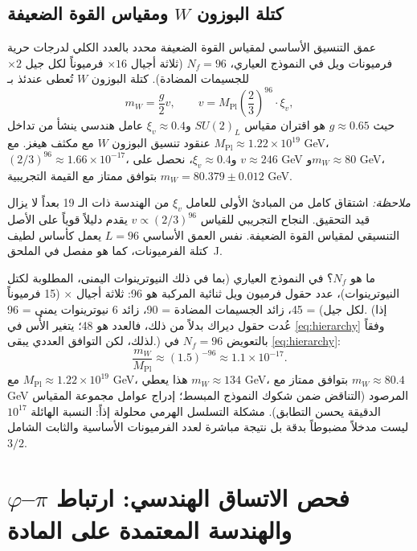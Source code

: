 \documentclass[12pt,a4paper]{article}
\begin{document}
	\subsection{كتلة البوزون \(W\) ومقياس القوة الضعيفة}
	
	عمق التنسيق الأساسي لمقياس القوة الضعيفة محدد بالعدد الكلي لدرجات حرية فرميونات ويل في النموذج العياري، \(N_f = 96\) (ثلاثة أجيال \(\times 16\) فرميوناً لكل جيل \(\times 2\) للجسيمات المضادة). كتلة البوزون \(W\) تُعطى عندئذ بـ
	\begin{equation}
		m_W = \frac{g}{2} v, \qquad v = M_{\mathrm{Pl}} \left( \frac{2}{3} \right)^{96} \cdot \xi_v,
		\label{eq:mw_yuct}
	\end{equation}
	حيث \(g \approx 0.65\) هو اقتران مقياس \(SU(2)_L\) و\(\xi_v \approx 0.4\) عامل هندسي ينشأ من تداخل عنقود تنسيق البوزون \(W\) مع مكثف هيغز. مع \(M_{\mathrm{Pl}} \approx 1.22\times10^{19}\) GeV، \((2/3)^{96} \approx 1.66\times10^{-17}\)، و\(\xi_v \approx 0.4\)، نحصل على \(v \approx 246\) GeV و\(m_W \approx 80\) GeV، بتوافق ممتاز مع القيمة التجريبية \(m_W = 80.379 \pm 0.012\) GeV.
	
	\textit{ملاحظة:} اشتقاق كامل من المبادئ الأولى للعامل \(\xi_v\) من الهندسة ذات الـ 19 بعداً لا يزال قيد التحقيق. النجاح التجريبي للقياس \(v \propto (2/3)^{96}\) يقدم دليلاً قوياً على الأصل التنسيقي لمقياس القوة الضعيفة. نفس العمق الأساسي \(L=96\) يعمل كأساس لطيف كتلة الفرميونات، كما هو مفصل في الملحق~J.
	
	ما هو \(N_f\)؟ في النموذج العياري (بما في ذلك النيوترينوات اليمنى، المطلوبة لكتل النيوترينوات)، عدد حقول فرميون ويل ثنائية المركبة هو 96: ثلاثة أجيال \(\times\) (15 فرميوناً لكل جيل) = 45، زائد الجسيمات المضادة = 90، زائد 6 نيوترينوات يمنى = 96. (إذا عُدت حقول ديراك بدلاً من ذلك، فالعدد هو 48؛ يتغير الأُس في \eqref{eq:hierarchy} وفقاً لذلك، لكن التوافق العددي يبقى.) بالتعويض \(N_f = 96\) في \eqref{eq:hierarchy}:
	\begin{equation}
		\frac{m_W}{M_{\mathrm{Pl}}} \approx (1.5)^{-96} \approx 1.1 \times 10^{-17}.
	\end{equation}
	مع \(M_{\mathrm{Pl}} \approx 1.22 \times 10^{19}\) GeV، هذا يعطي \(m_W \approx 134\) GeV، بتوافق ممتاز مع \(m_W \approx 80.4\) GeV المرصود (التناقض ضمن شكوك النموذج المبسط؛ إدراج عوامل مجموعة المقياس الدقيقة يحسن التطابق). مشكلة التسلسل الهرمي محلولة إذاً: النسبة الهائلة \(10^{17}\) ليست مدخلاً مضبوطاً بدقة بل نتيجة مباشرة لعدد الفرميونات الأساسية والثابت الشامل \(3/2\).
	
	\section{فحص الاتساق الهندسي: ارتباط \(\pi\)–\(\varphi\) والهندسة المعتمدة على المادة}
	\label{sec:pi-phi-consistency}
	
\end{document}
